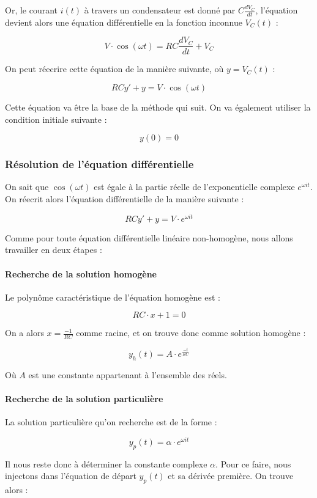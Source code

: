Or, le courant $i(t)$ à travers un condensateur est donné par $C \frac{dV_C}{dt}$, 
l'équation devient alors une équation différentielle en la fonction inconnue $V_C (t)$ :

$$V \cdot \cos (\omega t) = RC\frac{dV_C}{dt}  + V_C$$

On peut réecrire cette équation de la manière suivante, où $y = V_C(t)$ :

$$RCy' + y = V \cdot \cos (\omega t)$$

Cette équation va être la base de la méthode qui suit. On va également utiliser 
la condition initiale suivante :

$$y(0) = 0$$

\subsubsection{Résolution de l'équation différentielle}

On sait que $\cos (\omega t)$ est égale à la partie réelle de l'exponentielle
complexe $e^{\omega i t}$. On réecrit alors l'équation différentielle de la
manière suivante :

$$RCy' + y = V \cdot e^{\omega i t}$$

Comme pour toute équation différentielle linéaire non-homogène, nous allons travailler
en deux étapes :

\paragraph{Recherche de la solution homogène}

Le polynôme caractéristique de l'équation homogène est :

$$RC \cdot x + 1 = 0$$

On a alors $x = \frac{-1}{RC}$ comme racine, et on trouve donc comme solution homogène :

$$y_h(t) = A \cdot e^{\frac{-t}{RC}}$$

Où $A$ est une constante appartenant à l'ensemble des réels. %

\paragraph{Recherche de la solution particulière}

La solution particulière qu'on recherche est de la forme :

$$y_p(t) = \alpha \cdot e^{\omega i t}$$

Il nous reste donc à déterminer la constante complexe $\alpha$. Pour ce faire,
nous injectons dans l'équation de départ $y_p(t)$ et sa dérivée première. On
trouve alors :


